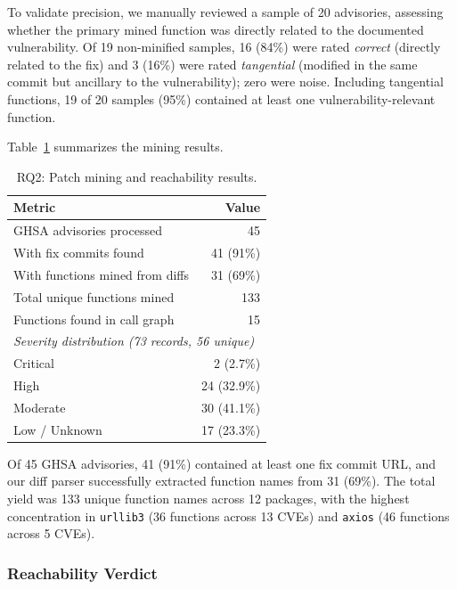 \documentclass[conference]{IEEEtran}
\begin{document}
To validate precision, we manually reviewed a sample of 20 advisories, assessing whether the primary mined function was directly related to the documented vulnerability. Of 19 non-minified samples, 16 (84\%) were rated \emph{correct} (directly related to the fix) and 3 (16\%) were rated \emph{tangential} (modified in the same commit but ancillary to the vulnerability); zero were noise. Including tangential functions, 19 of 20 samples (95\%) contained at least one vulnerability-relevant function.

Table~\ref{tab:rq2} summarizes the mining results.

\begin{table}[t]
    \centering
    \caption{RQ2: Patch mining and reachability results.}
    \label{tab:rq2}
    \begin{tabular}{lr}
        \toprule
        \textbf{Metric} & \textbf{Value} \\
        \midrule
        GHSA advisories processed      & 45 \\
        With fix commits found         & 41 (91\%) \\
        With functions mined from diffs & 31 (69\%) \\
        Total unique functions mined   & 133 \\
        Functions found in call graph  & 15 \\
        \midrule
        \multicolumn{2}{l}{\textit{Severity distribution (73 records, 56 unique)}} \\
        \;\;Critical & 2 (2.7\%) \\
        \;\;High & 24 (32.9\%) \\
        \;\;Moderate & 30 (41.1\%) \\
        \;\;Low / Unknown & 17 (23.3\%) \\
        \bottomrule
    \end{tabular}
\end{table}

Of 45 GHSA advisories, 41 (91\%) contained at least one fix commit URL, and our diff parser successfully extracted function names from 31 (69\%). The total yield was 133 unique function names across 12 packages, with the highest concentration in \texttt{urllib3} (36 functions across 13 CVEs) and \texttt{axios} (46 functions across 5 CVEs).

\subsubsection{Reachability Verdict}
\end{document}
